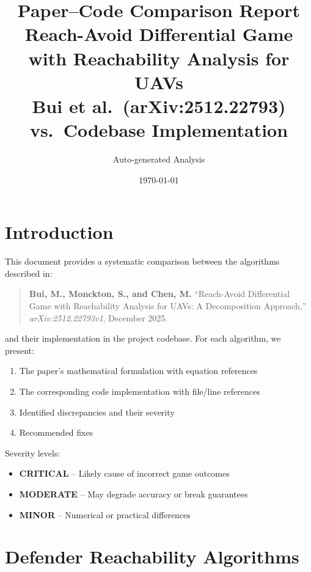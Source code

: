 \documentclass[11pt,a4paper]{article}
\title{\textbf{Paper--Code Comparison Report}\\[6pt]
\large Reach-Avoid Differential Game with Reachability Analysis for UAVs\\
Bui et al.\ (arXiv:2512.22793) vs.\ Codebase Implementation}
\author{Auto-generated Analysis}
\date{\today}
\begin{document}
\maketitle
\tableofcontents
\newpage

\section{Introduction}

This document provides a systematic comparison between the algorithms described in:

\begin{quote}
\textbf{Bui, M., Monckton, S., and Chen, M.} ``Reach-Avoid Differential Game with Reachability Analysis for UAVs: A Decomposition Approach,'' \textit{arXiv:2512.22793v1}, December 2025.
\end{quote}

\noindent and their implementation in the project codebase. For each algorithm, we present:
\begin{enumerate}[nosep]
\item The paper's mathematical formulation with equation references
\item The corresponding code implementation with file/line references
\item Identified discrepancies and their severity
\item Recommended fixes
\end{enumerate}

\noindent Severity levels:
\begin{itemize}[nosep]
\item \textcolor{critred}{\textbf{CRITICAL}} -- Likely cause of incorrect game outcomes
\item \textcolor{modoran}{\textbf{MODERATE}} -- May degrade accuracy or break guarantees
\item \textcolor{minblue}{\textbf{MINOR}} -- Numerical or practical differences
\end{itemize}

\section{Defender Reachability Algorithms}
\end{document}
